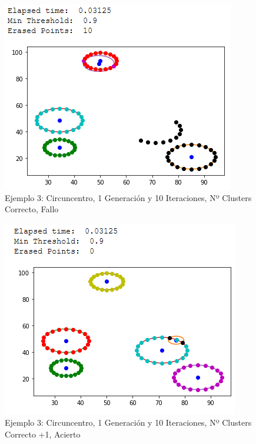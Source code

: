 \documentclass[conference,a4paper]{IEEEtran}
\begin{document}
\begin{figure}[H]
\centering
\includegraphics[scale=0.65]{Experimentacion/Ejemplo3/ej3_c_1_10_cc_wrong}
\caption{Ejemplo 3: Circuncentro, 1 Generación y 10 Iteraciones,  Nº Clusters Correcto, Fallo\\}
\end{figure}

\begin{figure}[H]
\centering
\includegraphics[scale=0.65]{Experimentacion/Ejemplo3/ej3_c_1_10_mc_correct}
\caption{Ejemplo 3: Circuncentro, 1 Generación y 10 Iteraciones,  Nº Clusters Correcto +1, Acierto\\}
\end{figure}
\end{document}
